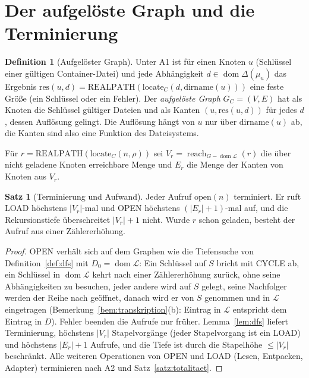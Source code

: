 \documentclass[a4paper,12pt,twoside]{report}
\DeclareRobustCommand{\_}{\ifmmode\mbox{\textunderscore}\else\textunderscore\allowbreak{}\fi}
\theoremstyle{definition}
\newtheorem{definition}{Definition}[chapter]
\newtheorem{satz}{Satz}[chapter]
\newcommand{\dom}{\operatorname{dom}}
\begin{document}
\section{Der aufgelöste Graph und die Terminierung}
\label{sec:term}

\begin{definition}[Aufgelöster Graph]
	\label{def:graph}
	Unter A1 ist für einen Knoten $u$ (Schlüssel einer gültigen Container-Datei) und jede Abhängigkeit $d\in\dom\Delta(\mu_u)$ das Ergebnis $\mathrm{res}(u,d)=\mathrm{REALPATH}(\mathrm{locate}_C(d,\mathrm{dirname}(u)))$ eine feste Größe (ein Schlüssel oder ein Fehler). Der \emph{aufgelöste Graph} $G_C=(V,E)$ hat als Knoten die Schlüssel gültiger Dateien und als Kanten $(u,\mathrm{res}(u,d))$ für jedes $d$, dessen Auflösung gelingt. Die Auflösung hängt von $u$ nur über $\mathrm{dirname}(u)$ ab, die Kanten sind also eine Funktion des Dateisystems.
\end{definition}

Für $r=\mathrm{REALPATH}(\mathrm{locate}_C(n,\rho))$ sei $V_r=\operatorname{reach}_{G-\dom\mathcal L}(r)$ die über nicht geladene Knoten erreichbare Menge und $E_r$ die Menge der Kanten von Knoten aus $V_r$.

\begin{satz}[Terminierung und Aufwand]
	\label{satz:terminierung}
	Jeder Aufruf $\mathrm{open}(n)$ terminiert. Er ruft LOAD höchstens $|V_r|$-mal und OPEN höchstens $(|E_r|+1)$-mal auf, und die Rekursionstiefe überschreitet $|V_r|+1$ nicht. Wurde $r$ schon geladen, besteht der Aufruf aus einer Zählererhöhung.
\end{satz}

\begin{proof}
	OPEN verhält sich auf dem Graphen wie die Tiefensuche von Definition~\ref{def:dfs} mit $D_0=\dom\mathcal L$: Ein Schlüssel auf $S$ bricht mit CYCLE ab, ein Schlüssel in $\dom\mathcal L$ kehrt nach einer Zählererhöhung zurück, ohne seine Abhängigkeiten zu besuchen, jeder andere wird auf $S$ gelegt, seine Nachfolger werden der Reihe nach geöffnet, danach wird er von $S$ genommen und in $\mathcal L$ eingetragen (Bemerkung~\ref{bem:transkription}(b): Eintrag in $\mathcal L$ entspricht dem Eintrag in $D$). Fehler beenden die Aufrufe nur früher. Lemma~\ref{lem:dfs} liefert Terminierung, höchstens $|V_r|$ Stapelvorgänge (jeder Stapelvorgang ist ein LOAD) und höchstens $|E_r|+1$ Aufrufe, und die Tiefe ist durch die Stapelhöhe $\le|V_r|$ beschränkt. Alle weiteren Operationen von OPEN und LOAD (Lesen, Entpacken, Adapter) terminieren nach A2 und Satz~\ref{satz:totalitaet}.
\end{proof}
\end{document}
